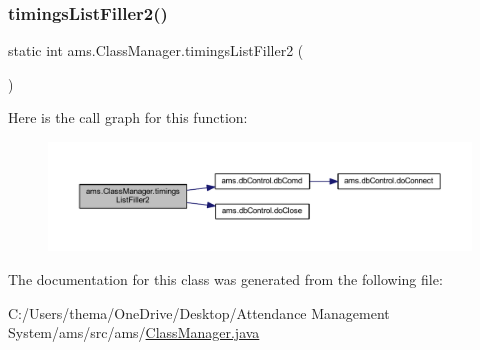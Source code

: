 \subsubsection{\texorpdfstring{timingsListFiller2()}{timingsListFiller2()}}
{\footnotesize\ttfamily static int ams.\+Class\+Manager.\+timings\+List\+Filler2 (\begin{DoxyParamCaption}{ }\end{DoxyParamCaption})\hspace{0.3cm}{\ttfamily [static]}}

Here is the call graph for this function\+:\nopagebreak
\begin{figure}[H]
\begin{center}
\leavevmode
\includegraphics[width=350pt]{classams_1_1_class_manager_a58654d39f62f9d5c11d8967c0fef3059_cgraph}
\end{center}
\end{figure}


The documentation for this class was generated from the following file\+:\begin{DoxyCompactItemize}
\item 
C\+:/\+Users/thema/\+One\+Drive/\+Desktop/\+Attendance Management System/ams/src/ams/\mbox{\hyperlink{_class_manager_8java}{Class\+Manager.\+java}}\end{DoxyCompactItemize}

